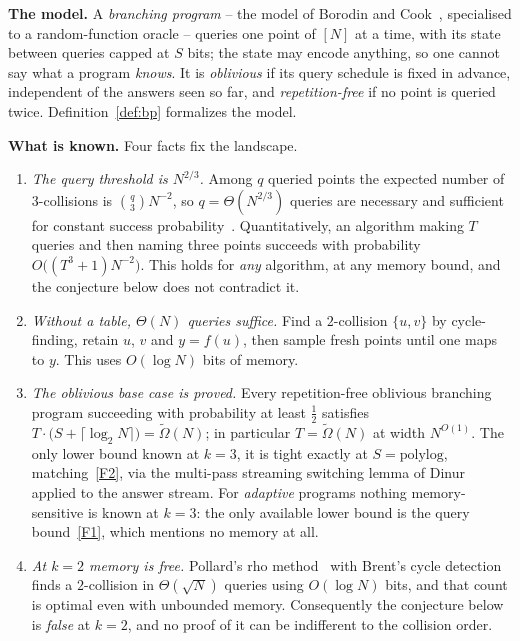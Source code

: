 \documentclass{aicr-conjecture}
\newcommand{\NN}{[N]}
\begin{document}
\smallskip
\noindent\textbf{The model.}
A \emph{branching program} -- the model of Borodin and Cook~\cite{BC82}, specialised to a
random-function oracle -- queries one point of $\NN$ at a time, with its state between queries
capped at $S$ bits; the state may encode anything, so one cannot say what a program \emph{knows}.
It is \emph{oblivious} if its query schedule is fixed in advance, independent of the answers seen
so far, and \emph{repetition-free} if no point is queried twice.  Definition~\ref{def:bp}
formalizes the model.

\smallskip
\noindent\textbf{What is known.}
Four facts fix the landscape.

\begin{enumerate}[label=(F\arabic*),ref=F\arabic*,leftmargin=*,itemsep=1pt,topsep=2pt]
\item\label{F1} \emph{The query threshold is $N^{2/3}$.}  Among $q$ queried points the expected
  number of $3$-collisions is $\binom{q}{3}N^{-2}$, so $q = \Theta(N^{2/3})$ queries are necessary
  and sufficient for constant success probability~\cite{STKT06}.  Quantitatively, an algorithm
  making $T$ queries and then naming three points succeeds with probability
  $O\bigl((T^{3}+1)N^{-2}\bigr)$.  This holds for \emph{any} algorithm, at any memory bound, and
  the conjecture below does not contradict it.
\item\label{F2} \emph{Without a table, $\Theta(N)$ queries suffice.}  Find a $2$-collision
  $\{u,v\}$ by cycle-finding, retain $u$, $v$ and $y = f(u)$, then sample fresh points until one
  maps to $y$.  This uses $O(\log N)$ bits of memory.
\item\label{F3} \emph{The oblivious base case is proved.}  Every repetition-free oblivious
  branching program succeeding with probability at least $\tfrac12$ satisfies
  $T \cdot \bigl(S + \lceil \log_{2} N \rceil\bigr) = \tilde\Omega(N)$; in particular
  $T = \tilde\Omega(N)$ at width $N^{O(1)}$.  The only lower bound known at $k=3$, it is tight
  exactly at $S = \mathrm{polylog}$, matching~\ref{F2}, via the multi-pass streaming switching
  lemma of Dinur~\cite{Din20} applied to the answer stream.  For \emph{adaptive} programs nothing
  memory-sensitive is known at $k=3$: the only available lower bound is the query
  bound~\ref{F1}, which mentions no memory at all.
\item\label{F4} \emph{At $k=2$ memory is free.}  Pollard's rho method~\cite{Pol75} with Brent's
  cycle detection~\cite{Bre80} finds a $2$-collision in $\Theta(\sqrt N)$ queries using
  $O(\log N)$ bits, and that count is optimal even with unbounded memory.  Consequently the
  conjecture below is \emph{false} at $k = 2$, and no proof of it can be indifferent to the
  collision order.
\end{enumerate}
\end{document}
